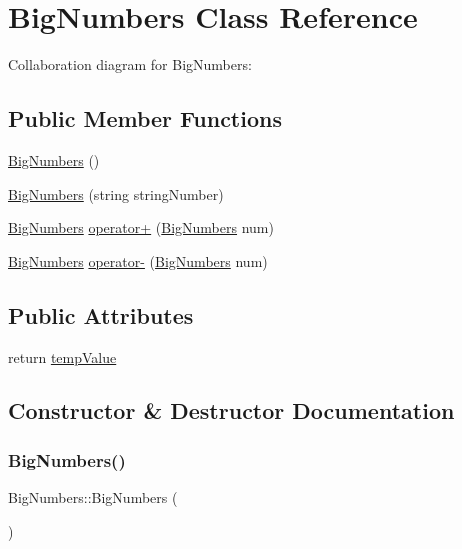 \hypertarget{class_big_numbers}{}\section{Big\+Numbers Class Reference}
\label{class_big_numbers}


Collaboration diagram for Big\+Numbers\+:
\subsection*{Public Member Functions}
\begin{DoxyCompactItemize}
\item 
\mbox{\hyperlink{class_big_numbers_af3dd82883f10f3473ac83280f26b0ad8}{Big\+Numbers}} ()
\item 
\mbox{\hyperlink{class_big_numbers_a562e1ff5243ea548a60b1c116eaea975}{Big\+Numbers}} (string string\+Number)
\item 
\mbox{\hyperlink{class_big_numbers}{Big\+Numbers}} \mbox{\hyperlink{class_big_numbers_a256473e2b7c3fe8dd1df1c62d38694df}{operator+}} (\mbox{\hyperlink{class_big_numbers}{Big\+Numbers}} num)
\item 
\mbox{\hyperlink{class_big_numbers}{Big\+Numbers}} \mbox{\hyperlink{class_big_numbers_a1647a46658f8692595ab4222c89e0ef6}{operator-\/}} (\mbox{\hyperlink{class_big_numbers}{Big\+Numbers}} num)
\end{DoxyCompactItemize}
\subsection*{Public Attributes}
\begin{DoxyCompactItemize}
\item 
return \mbox{\hyperlink{class_big_numbers_a308ecb6240a7159fd72fcb17f546b449}{temp\+Value}}
\end{DoxyCompactItemize}


\subsection{Constructor \& Destructor Documentation}
\mbox{\label{class_big_numbers_af3dd82883f10f3473ac83280f26b0ad8}} 
\subsubsection{\texorpdfstring{Big\+Numbers()}{BigNumbers()}\hspace{0.1cm}{\footnotesize\ttfamily [1/2]}}
{\footnotesize\ttfamily Big\+Numbers\+::\+Big\+Numbers (\begin{DoxyParamCaption}{ }\end{DoxyParamCaption})\hspace{0.3cm}{\ttfamily [inline]}}

